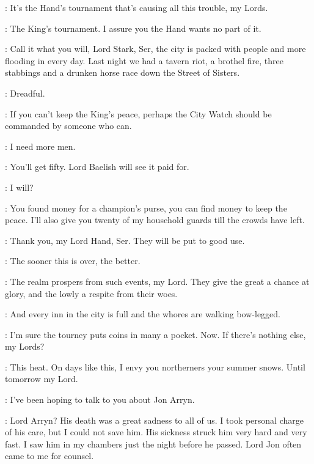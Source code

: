 
\JANOSSLYNT: It's the Hand's tournament that's causing all this trouble, my Lords. 

\NED: The King's tournament. I assure you the Hand wants no part of it. 

\JANOSSLYNT: Call it what you will, Lord Stark, Ser, the city is packed with people and more flooding in every day. Last night we had a tavern riot, a brothel fire, three stabbings and a drunken horse race down the Street of Sisters. 

\VARYS: Dreadful. 

\RENLY: If you can't keep the King's peace, perhaps the City Watch should be commanded by someone who can. 

\JANOSSLYNT: I need more men. 

\NED: You'll get fifty. Lord Baelish will see it paid for. 

\LITTLEFINGER: I will? 

\NED: You found money for a champion's purse, you can find money to keep the peace. I'll also give you twenty of my household guards till the crowds have left. 

\JANOSSLYNT: Thank you, my Lord Hand, Ser. They will be put to good use. 


\NED: The sooner this is over, the better. 

\VARYS: The realm prospers from such events, my Lord. They give the great a chance at glory, and the lowly a respite from their woes. 

\LITTLEFINGER: And every inn in the city is full and the whores are walking bow-legged. 

\NED: I'm sure the tourney puts coins in many a pocket. Now. If there's nothing else, my Lords? 


\PYCELLE: This heat. On days like this, I envy you northerners your summer snows. Until tomorrow my Lord. 

\NED: I've been hoping to talk to you about Jon Arryn. 

\PYCELLE: Lord Arryn? His death was a great sadness to all of us. I took personal charge of his care, but I could not save him. His sickness struck him very hard and very fast. I saw him in my chambers just the night before he passed. Lord Jon often came to me for counsel. 

